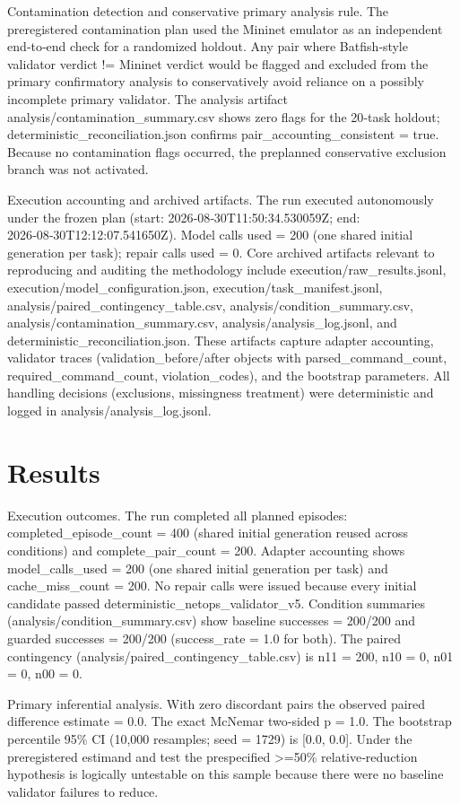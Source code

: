 \documentclass[conference]{IEEEtran}
\begin{document}
Contamination detection and conservative primary analysis rule. The preregistered contamination plan used the Mininet emulator as an independent end‑to‑end check for a randomized holdout. Any pair where Batfish‑style validator verdict != Mininet verdict would be flagged and excluded from the primary confirmatory analysis to conservatively avoid reliance on a possibly incomplete primary validator. The analysis artifact analysis/contamination\_summary.csv shows zero flags for the 20‑task holdout; deterministic\_reconciliation.json confirms pair\_accounting\_consistent = true. Because no contamination flags occurred, the preplanned conservative exclusion branch was not activated.

Execution accounting and archived artifacts. The run executed autonomously under the frozen plan (start: 2026‑08‑30T11:50:34.530059Z; end: 2026‑08‑30T12:12:07.541650Z). Model calls used = 200 (one shared initial generation per task); repair calls used = 0. Core archived artifacts relevant to reproducing and auditing the methodology include execution/raw\_results.jsonl, execution/model\_configuration.json, execution/task\_manifest.jsonl, analysis/paired\_contingency\_table.csv, analysis/condition\_summary.csv, analysis/contamination\_summary.csv, analysis/analysis\_log.jsonl, and deterministic\_reconciliation.json. These artifacts capture adapter accounting, validator traces (validation\_before/after objects with parsed\_command\_count, required\_command\_count, violation\_codes), and the bootstrap parameters. All handling decisions (exclusions, missingness treatment) were deterministic and logged in analysis/analysis\_log.jsonl.

\section{Results}
Execution outcomes. The run completed all planned episodes: completed\_episode\_count = 400 (shared initial generation reused across conditions) and complete\_pair\_count = 200. Adapter accounting shows model\_calls\_used = 200 (one shared initial generation per task) and cache\_miss\_count = 200. No repair calls were issued because every initial candidate passed deterministic\_netops\_validator\_v5. Condition summaries (analysis/condition\_summary.csv) show baseline successes = 200/200 and guarded successes = 200/200 (success\_rate = 1.0 for both). The paired contingency (analysis/paired\_contingency\_table.csv) is n11 = 200, n10 = 0, n01 = 0, n00 = 0.

Primary inferential analysis. With zero discordant pairs the observed paired difference estimate = 0.0. The exact McNemar two‑sided p = 1.0. The bootstrap percentile 95\% CI (10,000 resamples; seed = 1729) is [0.0, 0.0]. Under the preregistered estimand and test the prespecified >=50\% relative‑reduction hypothesis is logically untestable on this sample because there were no baseline validator failures to reduce.
\end{document}
